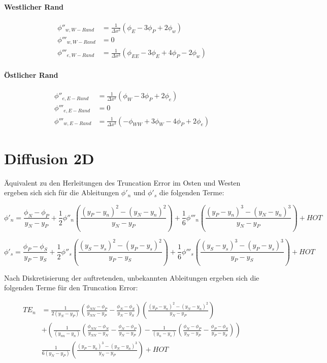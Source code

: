 \documentclass[11pt, ngerman,colorback,accentcolor=tud2d]{tudreport}
\begin{document}
\paragraph{Westlicher Rand}

\begin{align}
  \phi''_{w, W-Rand} &= \frac{1}{\Delta x^2} (\phi_E-3\phi_P+2\phi_w)\\
  \phi'''_{w, W-Rand} &= 0\\
  \phi'''_{e, W-Rand} &= \frac{1}{\Delta x^3} (\phi_{EE} -3\phi_E + 4\phi_P -2\phi_w)
\end{align}

\paragraph{Östlicher Rand}

\begin{align}
  \phi''_{e, E-Rand} &= \frac{1}{\Delta x^2} (\phi_W-3\phi_P+2\phi_e)\\
  \phi'''_{e, E-Rand} &= 0\\
  \phi'''_{w, E-Rand} &= \frac{1}{\Delta x^3} (-\phi_{WW} +3\phi_W - 4\phi_P +2\phi_e)
\end{align}

\section{Diffusion 2D}

Äquivalent zu den Herleitungen des Truncation Error im Osten und Westen ergeben sich
sich für die Ableitungen $\phi'_n$ und $\phi'_s$ die folgenden Terme:

\begin{equation}
  \phi'_n = \frac{\phi_N-\phi_P}{y_N-y_P}+\frac{1}{2}\phi''_n
\left({\frac{{(y_P-y_n)}^2-{(y_N-y_n)}^2}{y_N-y_P}}\right)+
\frac{1}{6} \phi'''_n \left({\frac{{(y_P-y_n)}^3-{(y_N-y_n)}^3}{y_N-y_P}}\right)+HOT
\end{equation}


\begin{equation}
  \phi'_s = \frac{\phi_P-\phi_S}{y_P-y_S}+\frac{1}{2}\phi''_s
\left({\frac{{(y_S-y_s)}^2-{(y_P-y_s)}^2}{y_P-y_S}}\right)+
\frac{1}{6} \phi'''_s \left({\frac{{(y_S-y_s)}^3-{(y_P-y_s)}^3}{y_P-y_S}}\right)+HOT
\end{equation}

Nach Diskretisierung der auftretenden, unbekannten Ableitungen ergeben sich die folgenden
Terme für den Truncation Error:

\begin{align*}
  {TE}_n &= \frac{1}{2 (y_N-y_P)}\left({
\frac{\phi_{NN}-\phi_P}{y_{NN}-y_P}-\frac{\phi_N-\phi_S}{y_N-y_S}}\right) \left({\frac{{(y_P-y_n)}^2-{(y_N-y_n)}^2}{y_N-y_P}}\right)\\
&+
\left({
\frac{1}{(y_{nn}-y_n)}
\left({\frac{\phi_{NN}-\phi_N}{y_{NN}-y_N}-\frac{\phi_N-\phi_P}{y_N-y_P} }\right)
-\frac{1}{(y_n-y_s)}
\left({\frac{\phi_N-\phi_P}{y_N-y_P} - \frac{\phi_P-\phi_S}{y_P-y_S}  }\right)
}\right)\\
&\frac{1}{6(y_N-y_P)}\left({\frac{{(y_P-y_n)}^3-{(y_N-y_n)}^3}{y_N-y_P}}\right)
+HOT
\end{align*}
\end{document}
